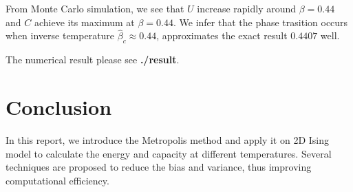 \documentclass{article}
\begin{document}
From Monte Carlo simulation, we see that $U$ increase rapidly around $\beta=0.44$ and $C$ achieve its maximum at $\beta=0.44$. We infer that the phase trasition occurs when inverse temperature $\hat   \beta_c\approx 0.44$, approximates the exact result $0.4407$ well.

The numerical result please see \textbf{./result}.
\section{Conclusion}
In this report, we introduce the Metropolis method and apply it on 2D Ising model to calculate the energy and capacity at different temperatures. Several techniques are proposed to reduce the bias and variance, thus improving computational efficiency.
\end{document}
